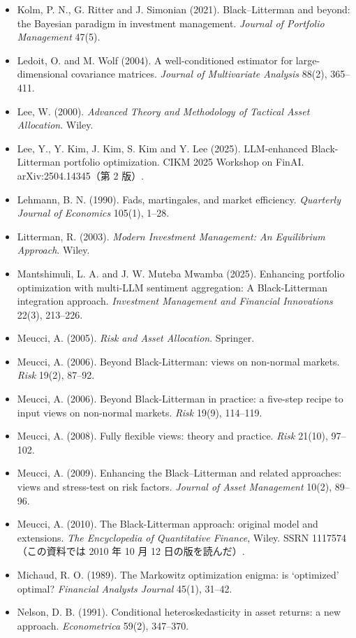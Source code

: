 {\begin{itemize}[leftmargin=1.2em,itemsep=0.25em,label={}]
\item Kolm, P. N., G. Ritter and J. Simonian (2021). Black--Litterman and beyond: the Bayesian paradigm in investment management. \textit{Journal of Portfolio Management} 47(5).
\item Ledoit, O. and M. Wolf (2004). A well-conditioned estimator for large-dimensional covariance matrices. \textit{Journal of Multivariate Analysis} 88(2), 365--411.
\item Lee, W. (2000). \textit{Advanced Theory and Methodology of Tactical Asset Allocation}. Wiley.
\item Lee, Y., Y. Kim, J. Kim, S. Kim and Y. Lee (2025). LLM-enhanced Black-Litterman portfolio optimization. CIKM 2025 Workshop on FinAI. arXiv:2504.14345（第 2 版）.
\item Lehmann, B. N. (1990). Fads, martingales, and market efficiency. \textit{Quarterly Journal of Economics} 105(1), 1--28.
\item Litterman, R. (2003). \textit{Modern Investment Management: An Equilibrium Approach}. Wiley.
\item Mantshimuli, L. A. and J. W. Muteba Mwamba (2025). Enhancing portfolio optimization with multi-LLM sentiment aggregation: A Black-Litterman integration approach. \textit{Investment Management and Financial Innovations} 22(3), 213--226.
\item Meucci, A. (2005). \textit{Risk and Asset Allocation}. Springer.
\item Meucci, A. (2006). Beyond Black-Litterman: views on non-normal markets. \textit{Risk} 19(2), 87--92.
\item Meucci, A. (2006). Beyond Black-Litterman in practice: a five-step recipe to input views on non-normal markets. \textit{Risk} 19(9), 114--119.
\item Meucci, A. (2008). Fully flexible views: theory and practice. \textit{Risk} 21(10), 97--102.
\item Meucci, A. (2009). Enhancing the Black--Litterman and related approaches: views and stress-test on risk factors. \textit{Journal of Asset Management} 10(2), 89--96.
\item Meucci, A. (2010). The Black-Litterman approach: original model and extensions. \textit{The Encyclopedia of Quantitative Finance}, Wiley. SSRN 1117574（この資料では 2010 年 10 月 12 日の版を読んだ）.
\item Michaud, R. O. (1989). The Markowitz optimization enigma: is `optimized' optimal? \textit{Financial Analysts Journal} 45(1), 31--42.
\item Nelson, D. B. (1991). Conditional heteroskedasticity in asset returns: a new approach. \textit{Econometrica} 59(2), 347--370.

\end{itemize}}
